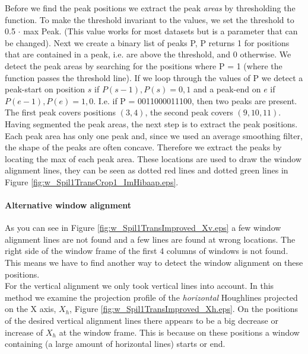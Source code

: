 Before we find the peak positions we extract the peak \emph{areas} by thresholding the
function. To make the threshold invariant to the values, we set the threshold to 0.5 $\cdot$ max Peak. 
(This value works for most datasets but is a parameter that can be changed).
Next we create a binary list of peaks P, P returns 1 for positions that are contained in
a peak, i.e. are above the threshold, and 0 otherwise.
We detect the peak areas by searching for the positions where P = 1
(where the function passes the threshold line). 
If we loop through the values of P we detect a peak-start on position $s$ if ${P(s-1),P(s)}={0,1}$
and a peak-end on $e$ if ${P(e-1),P(e)}={1,0}$. 
I.e. if P = 0011000011100, then two peaks are present. The first peak covers positions $(3,4)$, 
the second peak covers $(9,10,11)$.\\

Having segmented the peak areas, the next step is to extract the peak positions. 
Each peak area has only one peak and, since we used an average smoothing filter, the shape of 
the peaks are often concave. Therefore we extract the peaks by locating the max of each peak area. 
These locations are used to draw the window alignment lines, they can be seen
as dotted red lines and dotted green lines in Figure \ref{fig:w_Spil1TransCrop1_ImHibaap.eps}.

\paragraph{Alternative window alignment}
As you can see in Figure \ref{fig:w_Spil1TransImproved_Xv.eps}
a few window alignment lines are not found and a few lines are found at wrong locations.
The right side of the window frame of the first 4 columns of windows is not found.
This means we have to find another way to detect the window alignment on these positions.\\

For the vertical alignment we only took vertical lines into account.
In this method we examine the projection profile of the \emph{horizontal} Houghlines
projected on the X axis, $X_h$, Figure \ref{fig:w_Spil1TransImproved_Xh.eps}.
On the positions of the desired vertical alignment lines there appears to be a 
big decrease or increase of $X_h$ at the window frame. This is because on these
positions a window containing (a large amount of horizontal lines) starts or end.


